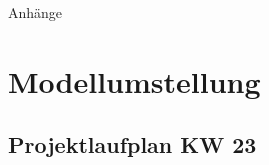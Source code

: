 %
%
%
\begin{appendix}

\newpage

\begin{center}
	\huge{Anhänge}
\end{center}

\normalsize

\section{Modellumstellung}
\label{trilateration_model_new}


\newpage
\begin{landscape}
	\section{Projektlaufplan KW 23}
	\label{sec:projectplan}
	\scalebox{.75}{
		
		}
\end{landscape}


\end{appendix}
